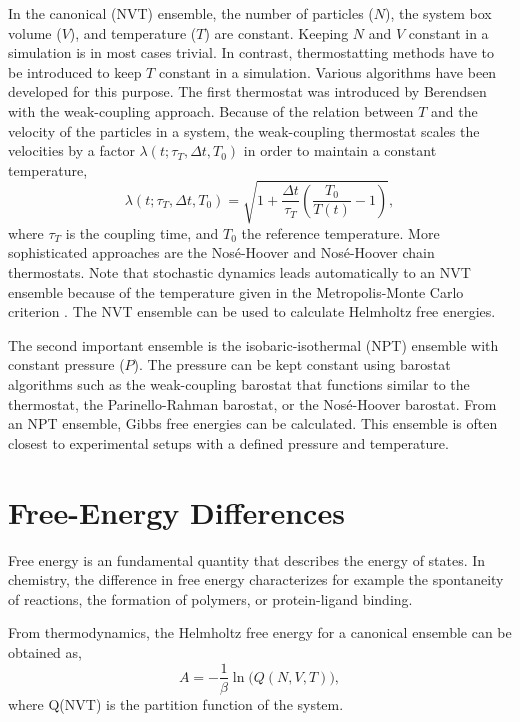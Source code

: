 In the canonical (NVT) ensemble, the number of particles ($N$), the system box volume ($V$), and temperature ($T$) are constant. Keeping $N$ and $V$ constant in a simulation is in most cases trivial. In contrast, thermostatting methods have to be introduced to keep $T$ constant in a simulation.  Various algorithms have been developed for this purpose. The first thermostat was introduced by Berendsen\cite{Berendsen1984} with the weak-coupling approach. Because of the relation between $T$ and the velocity of the particles in a system, the weak-coupling thermostat scales the velocities by a factor $\lambda(t; \tau_T, \Delta t, T_0)$ in order to maintain a constant temperature,  
\begin{equation}
    \lambda(t; \tau_T, \Delta t, T_0) = \sqrt{1 + \frac{\Delta t}{\tau_{T}} \left( \frac{T_0}{T(t)}-1 \right) },
\end{equation}
where $\tau_{T}$ is the coupling time, and $T_{0}$ the reference temperature.\cite{Berendsen1984}
More sophisticated approaches are the Nos\'e-Hoover\cite{Nose1984, Nose1984A, Hoover1985} and Nos\'e-Hoover chain\cite{Martyna1992} thermostats. Note that stochastic dynamics leads automatically to an NVT ensemble because of the temperature given in the Metropolis-Monte Carlo criterion \cite{Hastings1970}. The NVT ensemble can be used to calculate Helmholtz free energies\cite{Helmholtz1882}.

The second important ensemble is the isobaric-isothermal (NPT) ensemble with constant pressure ($P$). The pressure can be kept constant using barostat algorithms such as the weak-coupling barostat\cite{Berendsen1984} that functions similar to the thermostat, the Parinello-Rahman barostat\cite{Parrinello1981}, or the Nos\'e-Hoover barostat\cite{Nose1983}. From an NPT ensemble, Gibbs free energies can be calculated\cite{Gibbs1879}. This ensemble is often closest to experimental setups with a defined pressure and temperature.

\section{Free-Energy Differences}
Free energy is an fundamental quantity that describes the energy of states. In chemistry, the difference in free energy characterizes for example the spontaneity of reactions, the formation of polymers, or protein-ligand binding.\cite{Kollman1993, Armacost2020, Christ2009, Hansen2014, Cournia2020} 

From thermodynamics, the Helmholtz free energy\cite{Helmholtz1882} for a canonical ensemble can be obtained as, 
\begin{equation}
    A =  -\frac{1}{\beta} \ln\Big(Q(N, V, T)\Big),
\end{equation}
where Q(NVT) is the partition function of the system. \cite{Atkins2014}

